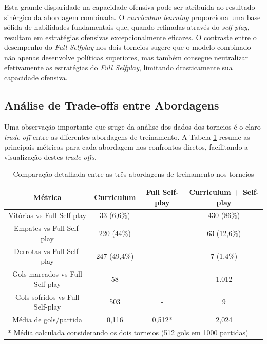 Esta grande disparidade na capacidade ofensiva pode ser atribuída ao resultado sinérgico da abordagem combinada. O \textit{curriculum learning} proporciona uma base sólida de habilidades fundamentais que, quando refinadas através do \textit{self-play}, resultam em estratégias ofensivas excepcionalmente eficazes. O contraste entre o desempenho do \textit{Full Selfplay} nos dois torneios sugere que o modelo combinado não apenas desenvolve políticas superiores, mas também consegue neutralizar efetivamente as estratégias do \textit{Full Selfplay}, limitando drasticamente sua capacidade ofensiva.

\subsection{Análise de Trade-offs entre Abordagens}

Uma observação importante que sruge da análise dos dados dos torneios é o claro \textit{trade-off} entre as diferentes abordagens de treinamento. A Tabela \ref{tab:comparacao_abordagens_detalhada} resume as principais métricas para cada abordagem nos confrontos diretos, facilitando a visualização destes \textit{trade-offs}.

\begin{table}[H]
    \centering
    \begin{tabular}{|c|c|c|c|}
        \hline
        \textbf{Métrica} & \textbf{Curriculum} & \textbf{Full Self-play} & \textbf{Curriculum + Self-play} \\
        \hline
        Vitórias vs Full Self-play & 33 (6,6\%) & - & 430 (86\%) \\
        \hline
        Empates vs Full Self-play & 220 (44\%) & - & 63 (12,6\%) \\
        \hline
        Derrotas vs Full Self-play & 247 (49,4\%) & - & 7 (1,4\%) \\
        \hline
        Gols marcados vs Full Self-play & 58 & - & 1.012 \\
        \hline
        Gols sofridos vs Full Self-play & 503 & - & 9 \\
        \hline
        Média de gols/partida & 0,116 & 0,512* & 2,024 \\
        \hline
        \multicolumn{4}{|l|}{* Média calculada considerando os dois torneios (512 gols em 1000 partidas)} \\
        \hline
    \end{tabular}
    \caption{Comparação detalhada entre as três abordagens de treinamento nos torneios}
    \label{tab:comparacao_abordagens_detalhada}
\end{table}

